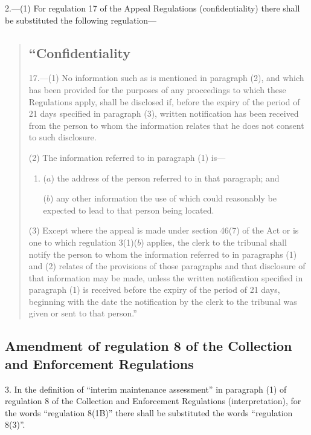 \documentclass[a4paper]{article}
\begin{document}
2.—(1) For regulation 17 of the Appeal Regulations (confidentiality) there shall be substituted the following regulation—
\begin{quotation}
\subsection*{“Confidentiality}

17.—(1) No information such as is mentioned in paragraph (2), and which has been provided for the purposes of any proceedings to which these Regulations apply, shall be disclosed if, before the expiry of the period of 21 days specified in paragraph (3), written notification has been received from the person to whom the information relates that he does not consent to such disclosure.

(2) The information referred to in paragraph (1) is—
\begin{enumerate}\item[]
($a$) the address of the person referred to in that paragraph; and

($b$) any other information the use of which could reasonably be expected to lead to that person being located.
\end{enumerate}

(3) Except where the appeal is made under section 46(7) of the Act or is one to which regulation 3(1)($b$) applies, the clerk to the tribunal shall notify the person to whom the information referred to in paragraphs (1) and (2) relates of the provisions of those paragraphs and that disclosure of that information may be made, unless the written notification specified in paragraph (1) is received before the expiry of the period of 21 days, beginning with the date the notification by the clerk to the tribunal was given or sent to that person.”
\end{quotation}

\subsection[3. Amendment of regulation 8 of the Collection and Enforcement Regulations]{Amendment of regulation 8 of the Collection and Enforcement Regulations}

3.  In the definition of “interim maintenance assessment” in paragraph (1) of regulation 8 of the Collection and Enforcement Regulations (interpretation), for the words “regulation 8(1B)” there shall be substituted the words “regulation 8(3)”.
\end{document}

